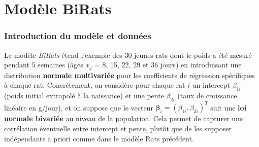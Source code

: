 \documentclass[12pt]{article}
\begin{document}
\section{Modèle BiRats}

\subsubsection{Introduction du modèle et données} 

Le modèle \emph{BiRats} étend l’exemple des 30 jeunes rats dont le poids a été mesuré pendant 5 semaines (âges $x_{j}$ = 8, 15, 22, 29 et 36 jours) en introduisant une distribution \textbf{normale multivariée} pour les coefficients de régression spécifiques à chaque rat. Concrètement, on considère pour chaque rat $i$ un intercept $\beta_{1i}$ (poids initial extrapolé à la naissance) et une pente $\beta_{2i}$ (taux de croissance linéaire en g/jour), et on suppose que le vecteur $\boldsymbol{\beta}_{i}=(\beta_{1i},\beta_{2i})^T$ suit une \textbf{loi normale bivariée} au niveau de la population. Cela permet de capturer une corrélation éventuelle entre intercept et pente, plutôt que de les supposer indépendants a priori comme dans le modèle \og Rats \fg{} précédent.
\end{document}
